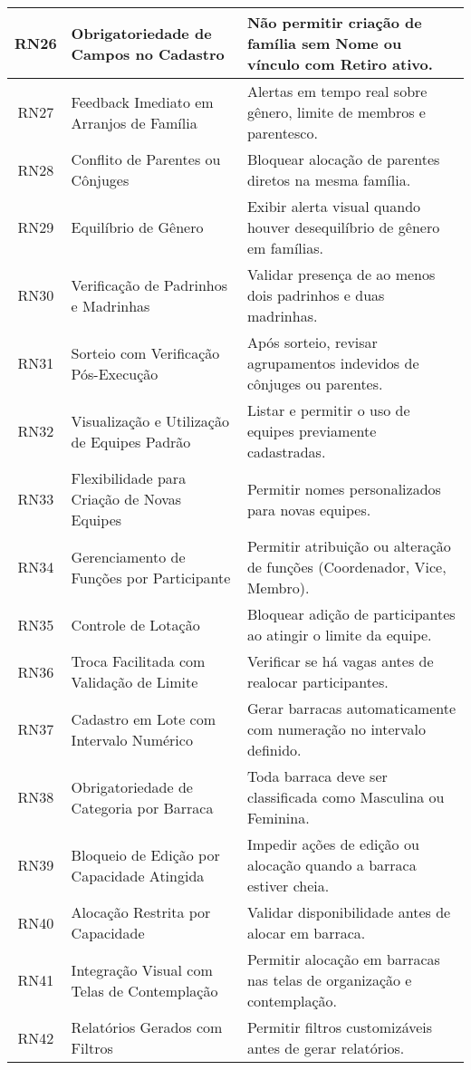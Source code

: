 \begin{longtable}{|c|>{\raggedright\arraybackslash}p{6cm}|>{\raggedright\arraybackslash}p{8cm}|}
\hline
RN26 & Obrigatoriedade de Campos no Cadastro & Não permitir criação de família sem Nome ou vínculo com Retiro ativo. \\
\hline
RN27 & Feedback Imediato em Arranjos de Família & Alertas em tempo real sobre gênero, limite de membros e parentesco. \\
\hline
RN28 & Conflito de Parentes ou Cônjuges & Bloquear alocação de parentes diretos na mesma família. \\
\hline
RN29 & Equilíbrio de Gênero & Exibir alerta visual quando houver desequilíbrio de gênero em famílias. \\
\hline
RN30 & Verificação de Padrinhos e Madrinhas & Validar presença de ao menos dois padrinhos e duas madrinhas. \\
\hline
RN31 & Sorteio com Verificação Pós-Execução & Após sorteio, revisar agrupamentos indevidos de cônjuges ou parentes. \\
\hline
RN32 & Visualização e Utilização de Equipes Padrão & Listar e permitir o uso de equipes previamente cadastradas. \\
\hline
RN33 & Flexibilidade para Criação de Novas Equipes & Permitir nomes personalizados para novas equipes. \\
\hline
RN34 & Gerenciamento de Funções por Participante & Permitir atribuição ou alteração de funções (Coordenador, Vice, Membro). \\
\hline
RN35 & Controle de Lotação & Bloquear adição de participantes ao atingir o limite da equipe. \\
\hline
RN36 & Troca Facilitada com Validação de Limite & Verificar se há vagas antes de realocar participantes. \\
\hline
RN37 & Cadastro em Lote com Intervalo Numérico & Gerar barracas automaticamente com numeração no intervalo definido. \\
\hline
RN38 & Obrigatoriedade de Categoria por Barraca & Toda barraca deve ser classificada como Masculina ou Feminina. \\
\hline
RN39 & Bloqueio de Edição por Capacidade Atingida & Impedir ações de edição ou alocação quando a barraca estiver cheia. \\
\hline
RN40 & Alocação Restrita por Capacidade & Validar disponibilidade antes de alocar em barraca. \\
\hline
RN41 & Integração Visual com Telas de Contemplação & Permitir alocação em barracas nas telas de organização e contemplação. \\
\hline
RN42 & Relatórios Gerados com Filtros & Permitir filtros customizáveis antes de gerar relatórios. \\

\end{longtable}
